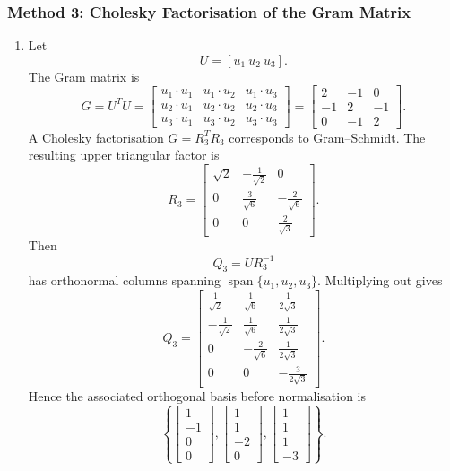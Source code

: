 \documentclass[12pt]{article}
\newcommand{\Span}{\operatorname{span}}
\begin{document}
\subsubsection{Method 3: Cholesky Factorisation of the Gram Matrix}
\begin{enumerate}[label=(\alph*)]
  \item Let
  \[
  U=[u_1\ u_2\ u_3].
  \]
  The Gram matrix is
  \[
  G=U^TU=
  \begin{bmatrix}
  u_1\cdot u_1&u_1\cdot u_2&u_1\cdot u_3\\
  u_2\cdot u_1&u_2\cdot u_2&u_2\cdot u_3\\
  u_3\cdot u_1&u_3\cdot u_2&u_3\cdot u_3
  \end{bmatrix}
  =\begin{bmatrix}
  2&-1&0\\
  -1&2&-1\\
  0&-1&2
  \end{bmatrix}.
  \]
  A Cholesky factorisation $G=R_3^TR_3$ corresponds to Gram--Schmidt. The resulting upper triangular factor is
  \[
  R_3=\begin{bmatrix}
  \sqrt2&-\frac1{\sqrt2}&0\\[0.3em]
  0&\frac3{\sqrt6}&-\frac2{\sqrt6}\\[0.3em]
  0&0&\frac2{\sqrt3}
  \end{bmatrix}.
  \]
  Then
  \[
  Q_3=UR_3^{-1}
  \]
  has orthonormal columns spanning $\Span\{u_1,u_2,u_3\}$. Multiplying out gives
  \[
  Q_3=\begin{bmatrix}
  \frac1{\sqrt2}&\frac1{\sqrt6}&\frac1{2\sqrt3}\\[0.3em]
  -\frac1{\sqrt2}&\frac1{\sqrt6}&\frac1{2\sqrt3}\\[0.3em]
  0&-\frac2{\sqrt6}&\frac1{2\sqrt3}\\[0.3em]
  0&0&-\frac3{2\sqrt3}
  \end{bmatrix}.
  \]
  Hence the associated orthogonal basis before normalisation is
  \[
  \boxed{
  \left\{
  \begin{bmatrix}1\\-1\\0\\0\end{bmatrix},
  \begin{bmatrix}1\\1\\-2\\0\end{bmatrix},
  \begin{bmatrix}1\\1\\1\\-3\end{bmatrix}
  \right\}.}
  \]


\end{enumerate}
\end{document}
